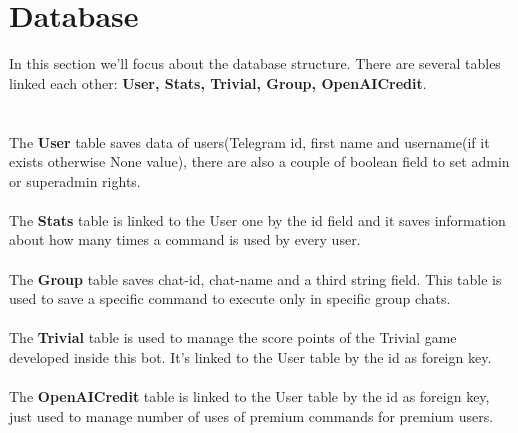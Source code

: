 \documentclass{article}
\begin{document}
\section{Database}
In this section we'll focus about the database structure. There are several tables linked each other: \textbf{User, Stats, Trivial, Group, OpenAICredit}. \\ \\ \\
The \textbf{User} table saves data of users(Telegram id, first name and username(if it exists otherwise None value), there are also a couple of boolean field to set admin or superadmin rights.\\ \\
The \textbf{Stats} table is linked to the User one by the id field and it saves information about how many times a command is used by every user. \\ \\
The \textbf{Group} table saves chat-id, chat-name and a third string field. This table is used to save a specific command to execute only in specific group chats.\\ \\
The \textbf{Trivial} table is used to manage the score points of the Trivial game developed inside this bot. It's linked to the User table by the id as foreign key. \\ \\
The \textbf{OpenAICredit} table is linked to the User table by the id as foreign key, just used to manage number of uses of premium commands for premium users.
\end{document}
